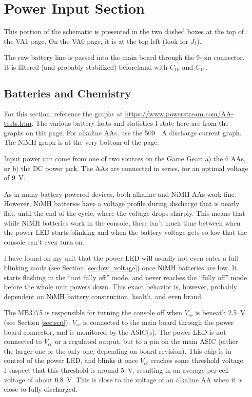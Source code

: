\documentclass{article}
\newcommand{\Vcc}{$V_{cc}$}
\newcommand{\model}{\textsf}
\begin{document}
\section{Power Input Section}
This portion of the schematic is presented in the two dashed boxes at
the top of the \model{VA1} page. On the \model{VA0} page, it is at the
top left (look for $J_1$).

The raw battery line is passed into the main board through the 9-pin
connector. It is filtered (and probably stabilized) beforehand with
$C_{10}$ and $C_{11}$.

\subsection{Batteries and Chemistry}
\label{sec:batteries_chemistry}
For this section, reference the graphs at
\url{https://www.powerstream.com/AA-tests.htm}. The various battery
facts and statistics I state here are from the graphs on this
page. For alkaline AAs, use the \qty{500}{\milli{}A} discharge current
graph. The NiMH graph is at the very bottom of the page.

Input power can come from one of two sources on the Game Gear: a) the
6 AAs, or b) the DC power jack. The AAs are connected in series, for
an optimal voltage of \qty{9}{\volt}.

As in many battery-powered devices, both alkaline and NiMH AAs work
fine. However, NiMH batteries have a voltage profile during discharge
that is nearly flat, until the end of the cycle, where the voltage
drops sharply. This means that while NiMH batteries work in the
console, there isn't much time between when the power LED starts
blinking and when the battery voltage gets so low that the console
can't even turn on.

I have found on my unit that the power LED will usually not even enter
a full blinking mode (see Section \ref{sec:low_voltage}) once NiMH
batteries are low. It starts flashing in the ``not fully off'' mode,
and never reaches the ``fully off'' mode before the whole unit powers
down. This exact behavior is, however, probably dependent on NiMH
battery construction, health, and even brand. 

The \model{MB3775} is responsible for turning the console off when
\Vcc{} is beneath \qty{2.5}{\volt} (see Section \ref{sec:scp}). \Vcc{}
is connected to the main board through the power board connector, and
is monitored by the ASIC(s). The power LED is not connected to \Vcc{}
or a regulated output, but to a pin on the main ASIC (either the
larger one or the only one, depending on board revision). This chip is
in control of the power LED, and blinks it once \Vcc{} reaches some
threshold voltage. I suspect that this threshold is around
\qty{5}{\volt}, resulting in an average per-cell voltage of about
\qty{0.8}{\volt}. This is close to the voltage of an alkaline AA when
it is close to fully discharged.
\end{document}
